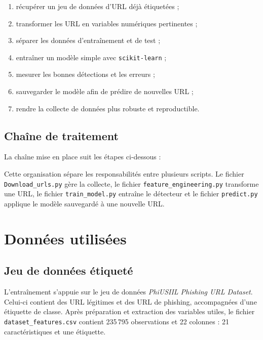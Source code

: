 \documentclass[11pt,a4paper]{report}
\begin{document}
\begin{enumerate}
  \item récupérer un jeu de données d'URL déjà étiquetées ;
  \item transformer les URL en variables numériques pertinentes ;
  \item séparer les données d'entraînement et de test ;
  \item entraîner un modèle simple avec \texttt{scikit-learn} ;
  \item mesurer les bonnes détections et les erreurs ;
  \item sauvegarder le modèle afin de prédire de nouvelles URL ;
  \item rendre la collecte de données plus robuste et reproductible.
\end{enumerate}

\section{Chaîne de traitement}

La chaîne mise en place suit les étapes ci-dessous :

\begin{center}
\end{center}

Cette organisation sépare les responsabilités entre plusieurs scripts. Le
fichier \texttt{Download\_urls.py} gère la collecte, le fichier
\texttt{feature\_engineering.py} transforme une URL, le fichier
\texttt{train\_model.py} entraîne le détecteur et le fichier
\texttt{predict.py} applique le modèle sauvegardé à une nouvelle URL.

\chapter{Données utilisées}

\section{Jeu de données étiqueté}

L'entraînement s'appuie sur le jeu de données \emph{PhiUSIIL Phishing URL
Dataset}. Celui-ci contient des URL légitimes et des URL de phishing,
accompagnées d'une étiquette de classe. Après préparation et extraction des
variables utiles, le fichier \texttt{dataset\_features.csv} contient
235\,795 observations et 22 colonnes : 21 caractéristiques et une étiquette.
\end{document}
